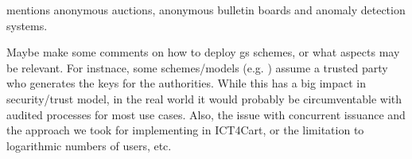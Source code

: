 \cite{ehk+19} mentions anonymous auctions, anonymous bulletin boards and
anomaly detection systems.

Maybe make some comments on how to deploy gs schemes, or what aspects may be
relevant. For instnace, some schemes/models (e.g. \cite{ly12}) assume a
trusted party who generates the keys for the authorities. While this has
a big impact in security/trust model, in the real world it would probably
be circumventable with audited processes for most use cases. Also, the
issue with concurrent issuance and the approach we took for implementing
\cite{gl19} in ICT4Cart, or the limitation to logarithmic numbers of users, etc.

